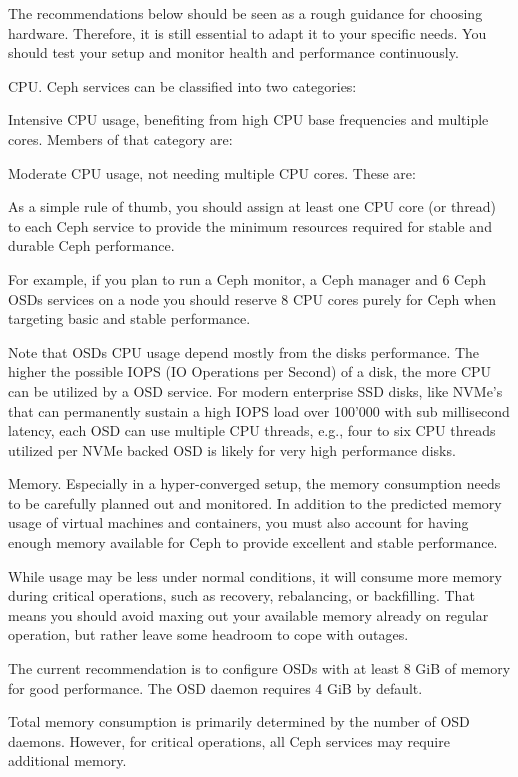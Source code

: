 The recommendations below should be seen as a rough guidance for choosing hardware. Therefore, it is still essential to adapt it to your specific needs. You should test your setup and monitor health and performance continuously.

CPU. Ceph services can be classified into two categories:

Intensive CPU usage, benefiting from high CPU base frequencies and multiple cores. Members of that category are:

Moderate CPU usage, not needing multiple CPU cores. These are:

As a simple rule of thumb, you should assign at least one CPU core (or thread) to each Ceph service to provide the minimum resources required for stable and durable Ceph performance.

For example, if you plan to run a Ceph monitor, a Ceph manager and 6 Ceph OSDs services on a node you should reserve 8 CPU cores purely for Ceph when targeting basic and stable performance.

Note that OSDs CPU usage depend mostly from the disks performance. The higher the possible IOPS (IO Operations per Second) of a disk, the more CPU can be utilized by a OSD service. For modern enterprise SSD disks, like NVMe’s that can permanently sustain a high IOPS load over 100’000 with sub millisecond latency, each OSD can use multiple CPU threads, e.g., four to six CPU threads utilized per NVMe backed OSD is likely for very high performance disks.

Memory. Especially in a hyper-converged setup, the memory consumption needs to be carefully planned out and monitored. In addition to the predicted memory usage of virtual machines and containers, you must also account for having enough memory available for Ceph to provide excellent and stable performance.

While usage may be less under normal conditions, it will consume more memory during critical operations, such as recovery, rebalancing, or backfilling. That means you should avoid maxing out your available memory already on regular operation, but rather leave some headroom to cope with outages.

The current recommendation is to configure OSDs with at least 8 GiB of memory for good performance. The OSD daemon requires 4 GiB by default.

Total memory consumption is primarily determined by the number of OSD daemons. However, for critical operations, all Ceph services may require additional memory.

